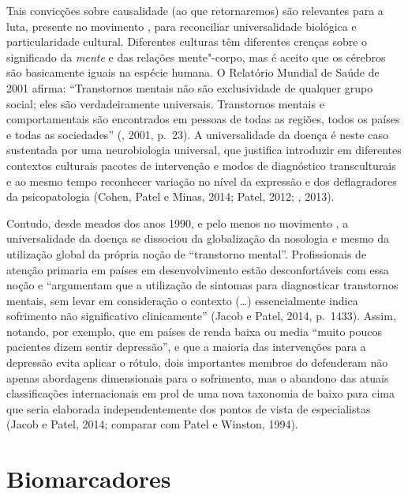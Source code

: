 Tais convicções sobre causalidade (ao que retornaremos) são relevantes
para a luta, presente no movimento , para reconciliar universalidade
biológica e particularidade cultural. Diferentes culturas têm diferentes
crenças sobre o significado da \emph{mente} e das relações mente"-corpo,
mas é aceito que os cérebros são basicamente iguais na espécie humana. O
Relatório Mundial de Saúde de 2001 afirma: ``Transtornos mentais não são
exclusividade de qualquer grupo social; eles são verdadeiramente
universais. Transtornos mentais e comportamentais são encontrados em
pessoas de todas as regiões, todos os países e todas as sociedades''
(, 2001, p.~23). A universalidade da doença é neste caso sustentada
por uma neurobiologia universal, que justifica introduzir em diferentes
contextos culturais pacotes de intervenção e modos de diagnóstico
transculturais e ao mesmo tempo reconhecer variação no nível da
expressão e dos deflagradores da psicopatologia (Cohen, Patel e Minas,
2014; Patel, 2012; , 2013).

Contudo, desde meados dos anos 1990, e pelo menos no movimento , a
universalidade da doença se dissociou da globalização da nosologia e
mesmo da utilização global da própria noção de ``transtorno mental''.
Profissionais de atenção primaria em países em desenvolvimento estão
desconfortáveis com essa noção e ``argumentam que a utilização de
sintomas para diagnosticar transtornos mentais, sem levar em
consideração o contexto (\ldots{}) essencialmente indica sofrimento não
significativo clinicamente'' (Jacob e Patel, 2014, p.~1433). Assim,
notando, por exemplo, que em países de renda baixa ou media ``muito
poucos pacientes dizem sentir depressão'', e que a maioria das
intervenções para a depressão evita aplicar o rótulo, dois importantes
membros do  defenderam não apenas abordagens dimensionais para o
sofrimento, mas o abandono das atuais classificações internacionais em
prol de uma nova taxonomia de baixo para cima que seria elaborada
independentemente dos pontos de vista de especialistas (Jacob e Patel,
2014; comparar com Patel e Winston, 1994).

\chapter{Biomarcadores}


